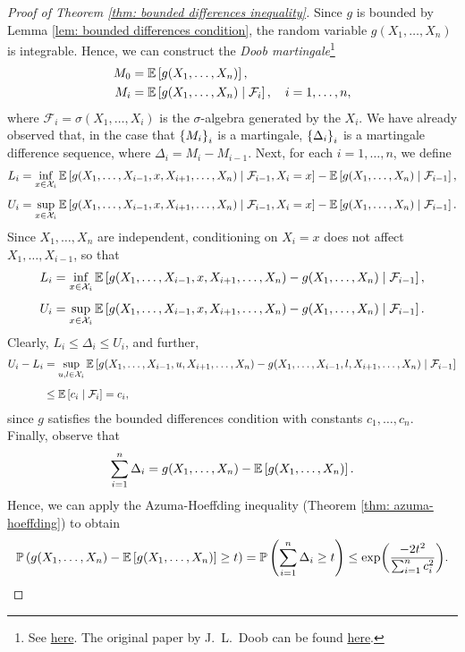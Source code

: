 \begin{proof}[Proof of Theorem \ref{thm: bounded differences inequality}]
Since $g$ is bounded by Lemma \ref{lem: bounded differences condition}, the random variable $g(X_1, \dots, X_n)$ is integrable. Hence, we can construct the \emph{Doob martingale}\footnote{See \href{https://en.wikipedia.org/wiki/Doob_martingale}{here}. The original paper by J.~L.~Doob can be found \href{https://www.ams.org/journals/tran/1940-047-03/S0002-9947-1940-0002052-6/S0002-9947-1940-0002052-6.pdf}{here}.}
\begin{align*}
    M_0 &= \mathbb{E}\left[g(X_1, \dots, X_n)\right], \\
    M_i &= \mathbb{E}\left[g(X_1, \dots, X_n) \mathrel{|} \mathcal{F}_i\right], \quad i = 1, \dots, n,
\end{align*}
where $\mathcal{F}_i = \sigma(X_1, \dots, X_i)$ is the $\sigma$-algebra generated by the $X_i$. We have already observed that, in the case that $\left\{M_i\right\}_i$ is a martingale, $\left\{\Delta_i\right\}_i$ is a martingale difference sequence, where $\Delta_i = M_i - M_{i-1}$. Next, for each $i = 1, \dots, n$, we define
\begin{align*}
    L_i &= \inf_{x \in \mathcal{X}_i} \mathbb{E}\left[g(X_1, \dots, X_{i-1}, x, X_{i+1}, \dots, X_n) \mathrel{|} \mathcal{F}_{i-1}, X_i = x\right] - \mathbb{E}\left[g(X_1, \dots, X_n) \mathrel{|} \mathcal{F}_{i-1}\right], \\[4pt]
    U_i &= \sup_{x \in \mathcal{X}_i} \mathbb{E}\left[g(X_1, \dots, X_{i-1}, x, X_{i+1}, \dots, X_n) \mathrel{|} \mathcal{F}_{i-1}, X_i = x\right] - \mathbb{E}\left[g(X_1, \dots, X_n) \mathrel{|} \mathcal{F}_{i-1}\right].
\end{align*}
Since $X_1, \dots, X_n$ are independent, conditioning on $X_i = x$ does not affect $X_1, \dots, X_{i-1}$, so that
\begin{align*}
    L_i &= \inf_{x \in \mathcal{X}_i} \mathbb{E}\left[g(X_1, \dots, X_{i-1}, x, X_{i+1}, \dots, X_n) - g(X_1, \dots, X_n) \mathrel{|} \mathcal{F}_{i-1}\right], \\[4pt]
    U_i &= \sup_{x \in \mathcal{X}_i} \mathbb{E}\left[g(X_1, \dots, X_{i-1}, x, X_{i+1}, \dots, X_n) - g(X_1, \dots, X_n) \mathrel{|} \mathcal{F}_{i-1}\right].
\end{align*}
Clearly, $L_i \leq \Delta_i \leq U_i$, and further,
\begin{align*}
    U_i - L_i &= \sup_{u, l \in \mathcal{X}_i} \mathbb{E}\left[g(X_1, \dots, X_{i-1}, u, X_{i+1}, \dots, X_n) - g(X_1, \dots, X_{i-1}, l, X_{i+1}, \dots, X_n) \mathrel{|} \mathcal{F}_{i-1}\right] \\[4pt]
        &\leq \mathbb{E}\left[c_i \mathrel{|} \mathcal{F}_i\right] = c_i,
\end{align*}
since $g$ satisfies the bounded differences condition with constants $c_1, \dots, c_n$. Finally, observe that
\[
    \sum_{i=1}^n \Delta_i = g(X_1, \dots, X_n) - \mathbb{E}\left[g(X_1, \dots, X_n)\right].
\]
Hence, we can apply the Azuma-Hoeffding inequality (Theorem \ref{thm: azuma-hoeffding}) to obtain
\[
    \mathbb{P}\left(g(X_1, \dots, X_n) - \mathbb{E}\left[g(X_1, \dots, X_n)\right] \geq t\right) = \mathbb{P}\left(\sum_{i=1}^n \Delta_i \geq t\right) \leq \exp(\frac{-2t^2}{\sum_{i=1}^n c_i^2}).
\]
\end{proof}

